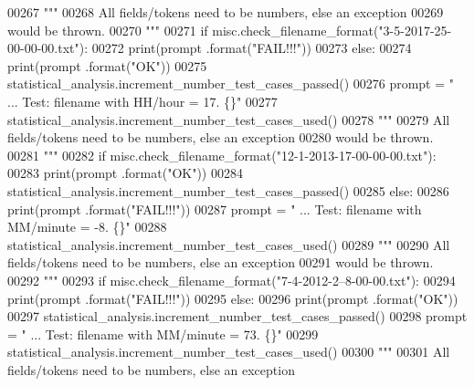 \begin{DoxyCode}
00267         \textcolor{stringliteral}{"""}
00268 \textcolor{stringliteral}{            All fields/tokens need to be numbers, else an exception}
00269 \textcolor{stringliteral}{                would be thrown.}
00270 \textcolor{stringliteral}{        """}
00271         \textcolor{keywordflow}{if} misc.check\_filename\_format(\textcolor{stringliteral}{"3-5-2017-25-00-00-00.txt"}):
00272             print(prompt .format(\textcolor{stringliteral}{"FAIL!!!"}))
00273         \textcolor{keywordflow}{else}:
00274             print(prompt .format(\textcolor{stringliteral}{"OK"}))
00275             statistical\_analysis.increment\_number\_test\_cases\_passed()
00276         prompt = \textcolor{stringliteral}{"  ... Test: filename with HH/hour = 17.           \{\}"}
00277         statistical\_analysis.increment\_number\_test\_cases\_used()
00278         \textcolor{stringliteral}{"""}
00279 \textcolor{stringliteral}{            All fields/tokens need to be numbers, else an exception}
00280 \textcolor{stringliteral}{                would be thrown.}
00281 \textcolor{stringliteral}{        """}
00282         \textcolor{keywordflow}{if} misc.check\_filename\_format(\textcolor{stringliteral}{"12-1-2013-17-00-00-00.txt"}):
00283             print(prompt .format(\textcolor{stringliteral}{"OK"}))
00284             statistical\_analysis.increment\_number\_test\_cases\_passed()
00285         \textcolor{keywordflow}{else}:
00286             print(prompt .format(\textcolor{stringliteral}{"FAIL!!!"}))
00287         prompt = \textcolor{stringliteral}{"  ... Test: filename with MM/minute = -8.         \{\}"}
00288         statistical\_analysis.increment\_number\_test\_cases\_used()
00289         \textcolor{stringliteral}{"""}
00290 \textcolor{stringliteral}{            All fields/tokens need to be numbers, else an exception}
00291 \textcolor{stringliteral}{                would be thrown.}
00292 \textcolor{stringliteral}{        """}
00293         \textcolor{keywordflow}{if} misc.check\_filename\_format(\textcolor{stringliteral}{"7-4-2012-2--8-00-00.txt"}):
00294             print(prompt .format(\textcolor{stringliteral}{"FAIL!!!"}))
00295         \textcolor{keywordflow}{else}:
00296             print(prompt .format(\textcolor{stringliteral}{"OK"}))
00297             statistical\_analysis.increment\_number\_test\_cases\_passed()
00298         prompt = \textcolor{stringliteral}{"  ... Test: filename with MM/minute = 73.         \{\}"}
00299         statistical\_analysis.increment\_number\_test\_cases\_used()
00300         \textcolor{stringliteral}{"""}
00301 \textcolor{stringliteral}{            All fields/tokens need to be numbers, else an exception}

\end{DoxyCode}
